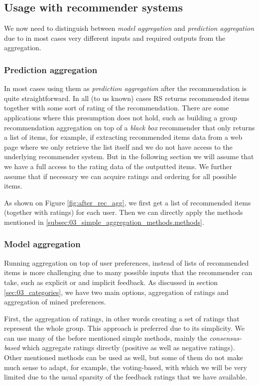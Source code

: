 \subsection{Usage with recommender systems}
We now need to distinguish between \textit{model aggregation} and \textit{prediction aggregation} due to in most cases very different inputs and required outputs from the aggregation.
\subsubsection{Prediction aggregation}
In most cases using them as \textit{prediction aggregation} after the recommendation is quite straightforward. In all (to us known) cases RS returns recommended items together with some sort of rating of the recommendation. There are some applications where this presumption does not hold, such as building a group recommendation aggregation on top of a \textit{black box} recommender that only returns a list of items, for example, if extracting recommended items data from a web page where we only retrieve the list itself and we do not have access to the underlying recommender system. But in the following section we will assume that we have a full access to the rating data of the outputted items. We further assume that if necessary we can acquire ratings and ordering for all possible items.

As shown on Figure \ref{fig:after_rec_agg}, we first get a list of recommended items (together with ratings) for each user. Then we can directly apply the methods mentioned in \ref{subsec:03_simple_aggregation_methods.methods}.

\subsubsection{Model aggregation}
Running aggregation on top of user preferences, instead of lists of recommended items is more challenging due to many possible inputs that the recommender can take, such as explicit or and implicit feedback. As discussed in section \ref{sec:03_categories}, we have two main options, aggregation of ratings and aggregation of mined preferences.

First, the aggregation of ratings, in other words creating a set of ratings that represent the whole group. This approach is preferred due to its simplicity. We can use many of the before mentioned simple methods, mainly the \textit{consensus-based} which aggregate ratings directly (positive as well as negative ratings). Other mentioned methods can be used as well, but some of them do not make much sense to adapt, for example, the voting-based, with which we will be very limited due to the usual sparsity of the feedback ratings that we have available.

